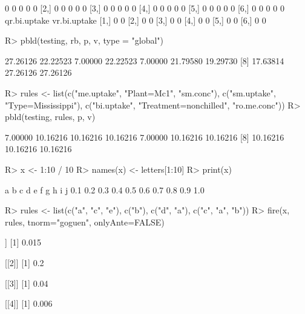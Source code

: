 \documentclass{article}\usepackage[]{graphicx}\usepackage[]{color}
\begin{document}
\begin{Schunk}
\begin{Soutput}
[1,]            0            0         0            0            0
[2,]            0            0         0            0            0
[3,]            0            0         0            0            0
[4,]            0            0         0            0            0
[5,]            0            0         0            0            0
[6,]            0            0         0            0            0
     qr.bi.uptake vr.bi.uptake
[1,]            0            0
[2,]            0            0
[3,]            0            0
[4,]            0            0
[5,]            0            0
[6,]            0            0
\end{Soutput}
%
% --end: "pbld5"
\end{Schunk}

\begin{Schunk}
% --begin: "pbld6"
\begin{Sinput}
R> pbld(testing, rb, p, v, type = "global")
\end{Sinput}
\begin{Soutput}
 [1] 27.26126 22.22523  7.00000 22.22523  7.00000 21.79580 19.29730
 [8] 17.63814 27.26126 27.26126
\end{Soutput}
%
% --end: "pbld6"
\end{Schunk}

\begin{Schunk}
% --begin: "pbld_custom"
\begin{Sinput}
R> rules <- list(c("me.uptake", "Plant=Mc1", "sm.conc"),
                 c("sm.uptake", "Type=Mississippi"),
                 c("bi.uptake", "Treatment=nonchilled", "ro.me.conc"))
R> pbld(testing, rules, p, v)
\end{Sinput}
\begin{Soutput}
 [1]  7.00000 10.16216 10.16216 10.16216  7.00000 10.16216 10.16216
 [8] 10.16216 10.16216 10.16216
\end{Soutput}
%
% --end: "pbld_custom"
\end{Schunk}

\begin{Schunk}
% --begin: "fire"
\begin{Sinput}
R> x <- 1:10 / 10
R> names(x) <- letters[1:10]
R> print(x)
\end{Sinput}
\begin{Soutput}
  a   b   c   d   e   f   g   h   i   j 
0.1 0.2 0.3 0.4 0.5 0.6 0.7 0.8 0.9 1.0 
\end{Soutput}
\begin{Sinput}
R> rules <- list(c("a", "c", "e"),
                 c("b"),
                 c("d", "a"),
                 c("c", "a", "b"))
R> fire(x, rules, tnorm="goguen", onlyAnte=FALSE)
\end{Sinput}
\begin{Soutput}
[[1]]
[1] 0.015

[[2]]
[1] 0.2

[[3]]
[1] 0.04

[[4]]
[1] 0.006
\end{Soutput}
%
% --end: "fire"
\end{Schunk}
\end{document}
